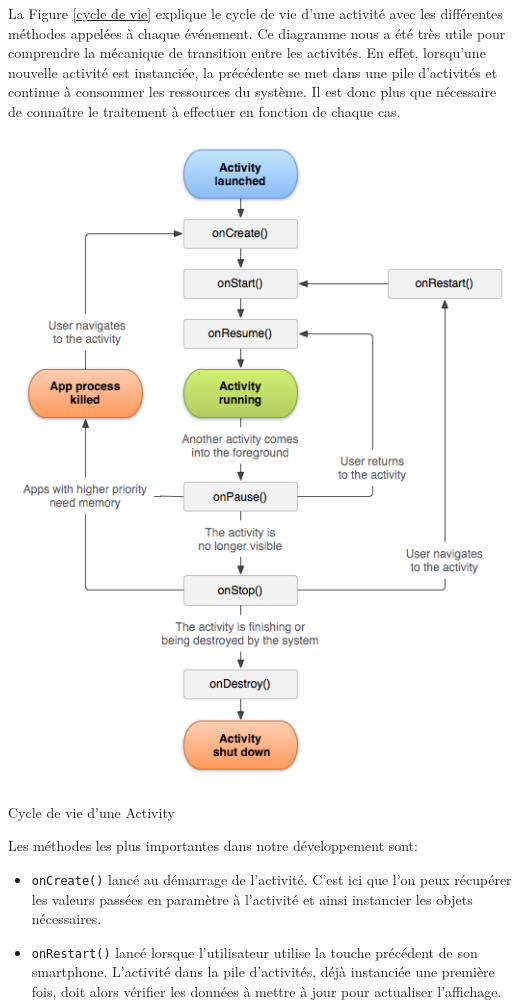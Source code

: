La Figure \ref{cycle de vie} explique le cycle de vie d'une activité avec les différentes méthodes appelées à chaque événement. Ce diagramme nous a été très utile pour comprendre la mécanique de transition entre les activités. En effet, lorsqu'une nouvelle activité est instanciée, la précédente se met dans une pile d'activités et continue à consommer les ressources du système. Il est donc plus que nécessaire de connaître le traitement à effectuer en fonction de chaque cas.

\begin{img}
  \includegraphics[scale=0.5]{img/cycle.png}
  \caption{Cycle de vie d'une Activity}
  \label{cycle de vie}
\end{img}

Les méthodes les plus importantes dans notre développement sont:\bigskip
 \begin{itemize}
 	\item \verb!onCreate()! lancé au démarrage de l'activité. C'est ici que l'on peux récupérer les valeurs passées en paramètre à l'activité et ainsi instancier les objets nécessaires.
 	\item \verb!onRestart()! lancé lorsque l'utilisateur utilise la touche précédent de son smartphone. L'activité dans la pile d'activités, déjà instanciée une première fois, doit alors vérifier les données à mettre à jour pour actualiser l'affichage.
 \end{itemize}

